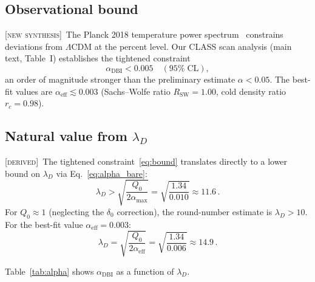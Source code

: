 \documentclass[prd,twocolumn,superscriptaddress,longbibliography,floatfix]{revtex4-2}
\newcommand{\derived}{\textsc{[derived]}}
\newcommand{\new}{\textsc{[new synthesis]}}
\begin{document}
\subsection{Observational bound}

\new\ The Planck 2018 temperature power
spectrum~\cite{Planck2018} constrains deviations from
$\Lambda$CDM at the percent level.  Our CLASS scan
analysis (main text, Table~I) establishes the
tightened constraint
\begin{equation}
\alpha_{\mathrm{DBI}} < 0.005
\quad (95\%\;\mathrm{CL}),
\label{eq:bound}
\end{equation}
an order of magnitude stronger than the preliminary
estimate $\alpha < 0.05$.  The best-fit values
are $\alpha_{\mathrm{eff}} \lesssim 0.003$
(Sachs--Wolfe ratio $R_{\mathrm{SW}} = 1.00$, cold
density ratio $r_c = 0.98$).

\subsection{Natural value from $\lambda_D$}

\derived\ The tightened constraint~\eqref{eq:bound}
translates directly to a lower bound on $\lambda_D$ via
Eq.~\eqref{eq:alpha_bare}:
\begin{equation}
\lambda_D > \sqrt{\frac{Q_0}{2\alpha_{\max}}}
= \sqrt{\frac{1.34}{0.010}} \approx 11.6\,.
\label{eq:lambda_bound}
\end{equation}
For $Q_0 \approx 1$ (neglecting the $\delta_0$
correction), the round-number estimate is
$\lambda_D > 10$.  For the best-fit value
$\alpha_{\mathrm{eff}} = 0.003$:
\begin{equation}
\lambda_D = \sqrt{\frac{Q_0}{2\alpha_{\mathrm{eff}}}}
= \sqrt{\frac{1.34}{0.006}} \approx 14.9\,.
\label{eq:lambda_bestfit}
\end{equation}

Table~\ref{tab:alpha} shows $\alpha_{\mathrm{DBI}}$
as a function of $\lambda_D$.
\end{document}
